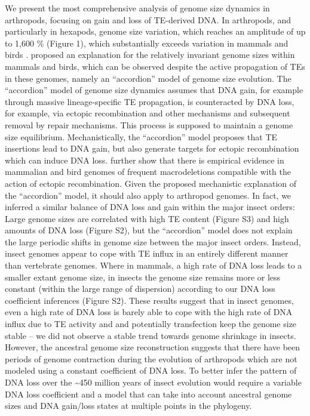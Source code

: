 We present the most comprehensive analysis of genome size dynamics in
arthropods, focusing on gain and loss of TE-derived DNA. In arthropods,
and particularly in hexapods, genome size variation, which reaches an
amplitude of up to 1,600 \% (Figure 1), which substantially exceeds
variation in mammals and birds \citep{Kapusta2017a}. \citet{Kapusta2017a}
proposed an explanation for the relatively invariant genome sizes within
mammals and birds, which can be observed despite the active propagation
of TEs in these genomes, namely an ``accordion'' model of genome size
evolution. The ``accordion'' model of genome size dynamics assumes that
DNA gain, for example through massive lineage-specific TE propagation,
is counteracted by DNA loss, for example, via ectopic recombination and
other mechanisms and subsequent removal by repair mechanisms. This
process is supposed to maintain a genome size equilibrium.
Mechanistically, the ``accordion'' model proposes that TE insertions
lead to DNA gain, but also generate targets for ectopic recombination
which can induce DNA loss. \citet{Kapusta2017a} further show that there is
empirical evidence in mammalian and bird genomes of frequent
macrodeletions compatible with the action of ectopic recombination.
Given the proposed mechanistic explanation of the ``accordion'' model,
it should also apply to arthropod genomes. In fact, we inferred a
similar balance of DNA loss and gain within the major insect orders:
Large genome sizes are correlated with high TE content (Figure S3) and
high amounts of DNA loss (Figure S2), but the ``accordion'' model does
not explain the large periodic shifts in genome size between the major
insect orders. Instead, insect genomes appear to cope with TE influx in
an entirely different manner than vertebrate genomes. Where in mammals,
a high rate of DNA loss leads to a smaller extant genome size, in
insects the genome size remains more or less constant (within the large
range of dispersion) according to our DNA loss coefficient inferences
(Figure S2). These results suggest that in insect genomes, even a high
rate of DNA loss is barely able to cope with the high rate of DNA influx
due to TE activity and and potentially transfection keep the genome size
stable -- we did not observe a stable trend towards genome shrinkage in
insects. However, the ancestral genome size reconstruction suggests that
there have been periods of genome contraction during the evolution of
arthropods which are not modeled using a constant coefficient of DNA
loss. To better infer the pattern of DNA loss over the
\textasciitilde{}450 million years of insect evolution would require a
variable DNA loss coefficient and a model that can take into account
ancestral genome sizes and DNA gain/loss states at multiple points in
the phylogeny.

